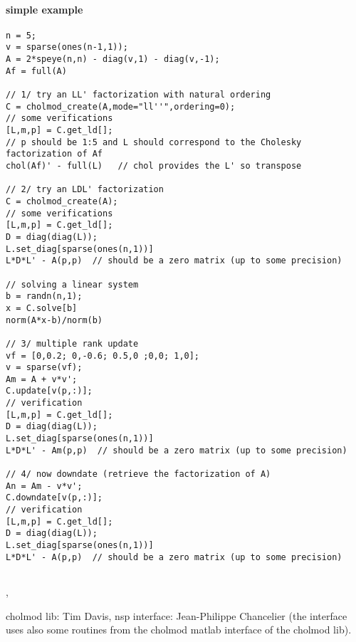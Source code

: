 \begin{examples}
 \paragraph{simple example}
  \begin{Verbatim}
n = 5;
v = sparse(ones(n-1,1));
A = 2*speye(n,n) - diag(v,1) - diag(v,-1);
Af = full(A)

// 1/ try an LL' factorization with natural ordering
C = cholmod_create(A,mode="ll''",ordering=0);
// some verifications
[L,m,p] = C.get_ld[];
// p should be 1:5 and L should correspond to the Cholesky factorization of Af
chol(Af)' - full(L)   // chol provides the L' so transpose

// 2/ try an LDL' factorization
C = cholmod_create(A);
// some verifications
[L,m,p] = C.get_ld[];
D = diag(diag(L));
L.set_diag[sparse(ones(n,1))]
L*D*L' - A(p,p)  // should be a zero matrix (up to some precision)

// solving a linear system
b = randn(n,1);
x = C.solve[b]
norm(A*x-b)/norm(b)

// 3/ multiple rank update
vf = [0,0.2; 0,-0.6; 0.5,0 ;0,0; 1,0];
v = sparse(vf);
Am = A + v*v';
C.update[v(p,:)];
// verification
[L,m,p] = C.get_ld[];
D = diag(diag(L));
L.set_diag[sparse(ones(n,1))]
L*D*L' - Am(p,p)  // should be a zero matrix (up to some precision)

// 4/ now downdate (retrieve the factorization of A)
An = Am - v*v';
C.downdate[v(p,:)];
// verification
[L,m,p] = C.get_ld[];
D = diag(diag(L));
L.set_diag[sparse(ones(n,1))]
L*D*L' - A(p,p)  // should be a zero matrix (up to some precision)


  \end{Verbatim}
 \end{examples}

\begin{manseealso}
  ,
\end{manseealso}

\begin{authors}
   cholmod lib: Tim Davis, nsp interface: Jean-Philippe Chancelier (the interface uses also
   some routines from the cholmod matlab interface of the cholmod lib).
\end{authors}
